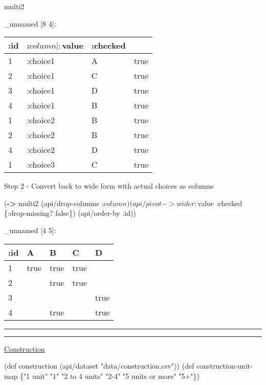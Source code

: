 \documentclass[]{article}
\newenvironment{Shaded}{\begin{snugshade}}{\end{snugshade}}
\newcommand{\AttributeTok}[1]{\textcolor[rgb]{0.77,0.63,0.00}{#1}}
\newcommand{\BuiltInTok}[1]{#1}
\newcommand{\FunctionTok}[1]{\textcolor[rgb]{0.00,0.00,0.00}{#1}}
\newcommand{\KeywordTok}[1]{\textcolor[rgb]{0.13,0.29,0.53}{\textbf{#1}}}
\newcommand{\NormalTok}[1]{#1}
\newcommand{\StringTok}[1]{\textcolor[rgb]{0.31,0.60,0.02}{#1}}
\newcommand{\VariableTok}[1]{\textcolor[rgb]{0.00,0.00,0.00}{#1}}
\begin{document}
\begin{Shaded}
\begin{Highlighting}[]
\NormalTok{multi2}
\end{Highlighting}
\end{Shaded}

\_unnamed {[}8 4{]}:

\begin{longtable}[]{@{}llll@{}}
\toprule
:id & :\(column | :\)value & :checked &\tabularnewline
\midrule
\endhead
1 & :choice1 & A & true\tabularnewline
2 & :choice1 & C & true\tabularnewline
3 & :choice1 & D & true\tabularnewline
4 & :choice1 & B & true\tabularnewline
1 & :choice2 & B & true\tabularnewline
2 & :choice2 & B & true\tabularnewline
4 & :choice2 & D & true\tabularnewline
1 & :choice3 & C & true\tabularnewline
\bottomrule
\end{longtable}

Step 2 - Convert back to wide form with actual choices as columns

\begin{Shaded}
\begin{Highlighting}[]
\NormalTok{(}\KeywordTok{->}\NormalTok{ multi2}
\NormalTok{    (api/drop-columns :$column)}
\NormalTok{    (api/pivot->wider :$value }\AttributeTok{:checked}\NormalTok{ \{}\AttributeTok{:drop-missing}\NormalTok{? }\VariableTok{false}\NormalTok{\})}
\NormalTok{    (api/order-by }\AttributeTok{:id}\NormalTok{))}
\end{Highlighting}
\end{Shaded}

\_unnamed {[}4 5{]}:

\begin{longtable}[]{@{}lllll@{}}
\toprule
:id & A & B & C & D\tabularnewline
\midrule
\endhead
1 & true & true & true &\tabularnewline
2 & & true & true &\tabularnewline
3 & & & & true\tabularnewline
4 & & true & & true\tabularnewline
\bottomrule
\end{longtable}

\begin{center}\rule{0.5\linewidth}{0.5pt}\end{center}

\begin{center}\rule{0.5\linewidth}{0.5pt}\end{center}

\href{https://tidyr.tidyverse.org/articles/pivot.html\#by-hand}{Construction}

\begin{Shaded}
\begin{Highlighting}[]
\NormalTok{(}\BuiltInTok{def}\FunctionTok{ construction }\NormalTok{(api/dataset }\StringTok{"data/construction.csv"}\NormalTok{))}
\NormalTok{(}\BuiltInTok{def}\FunctionTok{ construction-unit-map }\NormalTok{\{}\StringTok{"1 unit"} \StringTok{"1"}
                            \StringTok{"2 to 4 units"} \StringTok{"2-4"}
                            \StringTok{"5 units or more"} \StringTok{"5+"}\NormalTok{\})}
\end{Highlighting}
\end{Shaded}
\end{document}
